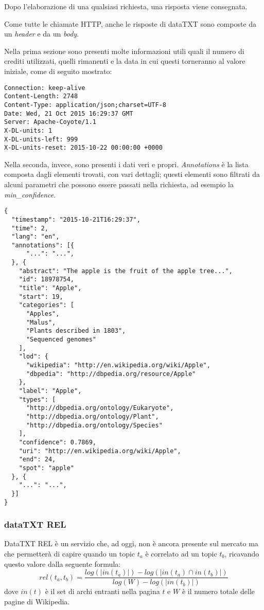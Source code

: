 		Dopo l'elaborazione di una qualsiasi richiesta, una risposta viene consegnata.

		Come  tutte le chiamate HTTP, anche le risposte di dataTXT sono composte da un \emph{header} e da un \emph{body}.

		Nella prima sezione sono presenti molte informazioni utili quali il numero di crediti utilizzati, quelli rimanenti e la data in cui questi torneranno al valore iniziale, come di seguito mostrato:
		
		\begin{lstlisting}
Connection: keep-alive
Content-Length: 2748
Content-Type: application/json;charset=UTF-8
Date: Wed, 21 Oct 2015 16:29:37 GMT
Server: Apache-Coyote/1.1
X-DL-units: 1
X-DL-units-left: 999
X-DL-units-reset: 2015-10-22 00:00:00 +0000
		\end{lstlisting}

		Nella seconda, invece, sono presenti i dati veri e propri. \emph{Annotations} è la lista composta dagli elementi trovati, con vari dettagli; questi elementi sono filtrati da alcuni parametri che possono essere passati nella richiesta,  ad esempio la \emph{min\_confidence}.

		\begin{lstlisting}
{
  "timestamp": "2015-10-21T16:29:37",
  "time": 2,
  "lang": "en",
  "annotations": [{
      "...": "...",
  }, {
    "abstract": "The apple is the fruit of the apple tree...",
    "id": 18978754,
    "title": "Apple",
    "start": 19,
    "categories": [
      "Apples",
      "Malus",
      "Plants described in 1803",
      "Sequenced genomes"
    ],
    "lod": {
      "wikipedia": "http://en.wikipedia.org/wiki/Apple",
      "dbpedia": "http://dbpedia.org/resource/Apple"
    },
    "label": "Apple",
    "types": [
      "http://dbpedia.org/ontology/Eukaryote",
      "http://dbpedia.org/ontology/Plant",
      "http://dbpedia.org/ontology/Species"
    ],
    "confidence": 0.7869,
    "uri": "http://en.wikipedia.org/wiki/Apple",
    "end": 24,
    "spot": "apple"
  }, {
    "...": "...",
  }]
}
		\end{lstlisting}

	\subsubsection{dataTXT REL}
		DataTXT REL  è un servizio che, ad oggi, non è ancora presente sul mercato ma che permetterà di capire quando un topic $t_a$ è correlato ad un topic $t_b$, ricavando questo valore dalla seguente formula:
		\begin{equation*}
			rel(t_a, t_b) = \frac{log(| in(t_a) |) - log(| in(t_a) \cap in(t_b)|)}{log(W) - log(|in(t_b)|)}
		\end{equation*}
		dove $in(t)$ è il set di archi entranti nella pagina $t$ e $W$ è il numero totale delle pagine di Wikipedia\cite{datatxt_graph}.

